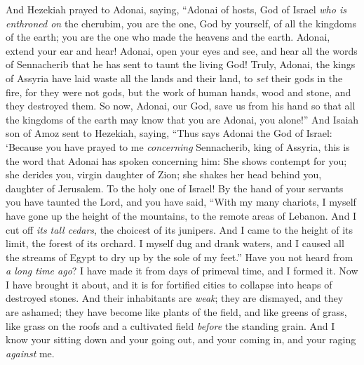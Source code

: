 \begin{biblechapter}
\verse And Hezekiah prayed to Adonai, saying,
\verse “Adonai of hosts, God of Israel \textit{who is enthroned on} the cherubim, you are the one, God by yourself, of all the kingdoms of the earth; you are the one who made the heavens and the earth.
\verse Adonai, extend your ear and hear! Adonai, open your eyes and see, and hear all the words of Sennacherib that he has sent to taunt the living God!
\verse Truly, Adonai, the kings of Assyria have laid waste all the lands and their land,
\verse to \textit{set} their gods in the fire, for they were not gods, but the work of human hands, wood and stone, and they destroyed them.
\verse So now, Adonai, our God, save us from his hand so that all the kingdoms of the earth may know that you are Adonai, you alone!”
 And Isaiah son of Amoz sent to Hezekiah, saying, “Thus says Adonai the God of Israel: ‘Because you have prayed to me \textit{concerning} Sennacherib, king of Assyria,
\verse this is the word that Adonai has spoken concerning him:
\verse She shows contempt for you; she derides you, virgin daughter of Zion; 
she shakes her head behind you, daughter of Jerusalem. To the holy one of Israel!
\verse By the hand of your servants you have taunted the Lord, 
and you have said, “With my many chariots, 
I myself have gone up the height of the mountains, 
to the remote areas of Lebanon. 
And I cut off \textit{its tall cedars}, 
the choicest of its junipers. 
And I came to the height of its limit, 
the forest of its orchard.
\verse I myself dug and drank waters, 
and I caused all the streams of Egypt to dry up by the sole of my feet.”
\verse Have you not heard from \textit{a long time ago}? I have made it 
from days of primeval time, and I formed it. 
Now I have brought it about, 
and it is for fortified cities to collapse into heaps of destroyed stones.
\verse And their inhabitants are \textit{weak}; 
they are dismayed, and they are ashamed; 
they have become like plants of the field, 
and like greens of grass, 
like grass on the roofs 
and a cultivated field \textit{before} the standing grain.
\verse And I know your sitting down and your going out, 
and your coming in, and your raging \textit{against} me.

\end{biblechapter}
